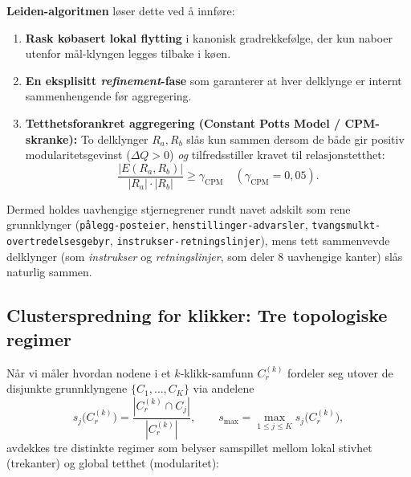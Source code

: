 \documentclass[11pt,a4paper]{article}
\begin{document}
\textbf{Leiden-algoritmen} \cite{traag2019louvain} løser dette ved å innføre:
\begin{enumerate}[label=\arabic*.]
  \item \textbf{Rask købasert lokal flytting} i kanonisk gradrekkefølge, der kun naboer utenfor mål-klyngen legges tilbake i køen.
  \item \textbf{En eksplisitt \emph{refinement}-fase} som garanterer at hver delklynge er internt sammenhengende før aggregering.
  \item \textbf{Tetthetsforankret aggregering (Constant Potts Model / CPM-skranke):} To delklynger $R_a, R_b$ slås kun sammen dersom de både gir positiv modularitetsgevinst ($\Delta Q > 0$) \emph{og} tilfredsstiller kravet til relasjonstetthet:
    \begin{equation}
      \frac{|E(R_a, R_b)|}{|R_a| \cdot |R_b|} \ge \gamma_{\text{CPM}} \quad (\gamma_{\text{CPM}} = 0{,}05).
    \end{equation}
\end{enumerate}
Dermed holdes uavhengige stjernegrener rundt navet adskilt som rene grunnklynger (\texttt{pålegg-posteier}, \texttt{henstillinger-advarsler}, \texttt{tvangsmulkt-overtredelsesgebyr}, \texttt{instrukser-retningslinjer}), mens tett sammenvevde delklynger (som \emph{instrukser} og \emph{retningslinjer}, som deler 8 uavhengige kanter) slås naturlig sammen.

\subsection{Clusterspredning for klikker: Tre topologiske regimer}
Når vi måler hvordan nodene i et $k$-klikk-samfunn $C^{(k)}_r$ fordeler seg utover de disjunkte grunnklyngene $\{C_1, \dots, C_K\}$ via andelene
\[
  s_j\big(C^{(k)}_r\big) = \frac{|C^{(k)}_r \cap C_j|}{|C^{(k)}_r|}, \qquad s_{\max} = \max_{1 \le j \le K} s_j\big(C^{(k)}_r\big),
\]
avdekkes tre distinkte regimer som belyser samspillet mellom lokal stivhet (trekanter) og global tetthet (modularitet):
\end{document}
